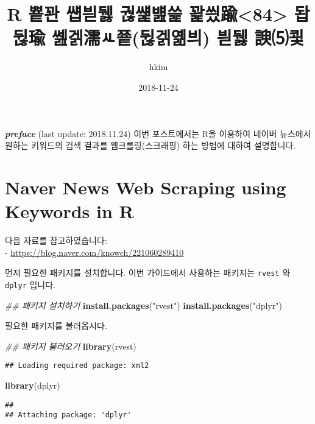 \documentclass[]{article}
\title{R 뿉꽌 썝븯뒗 궎썙뱶쓽 꽕씠踰\textless{}84\textgreater{} 돱뒪瑜
쎒겕濡ㅻ쭅(뒪겕옒븨) 븯뒗 諛⑸쾿}
\author{hkim}
\date{2018-11-24}
\newenvironment{Shaded}{\begin{snugshade}}{\end{snugshade}}
\newcommand{\CommentTok}[1]{\textcolor[rgb]{0.56,0.35,0.01}{\textit{#1}}}
\newcommand{\KeywordTok}[1]{\textcolor[rgb]{0.13,0.29,0.53}{\textbf{#1}}}
\newcommand{\NormalTok}[1]{#1}
\newcommand{\StringTok}[1]{\textcolor[rgb]{0.31,0.60,0.02}{#1}}
\begin{document}
\maketitle

\textbf{\emph{preface}} (last update: 2018.11.24) 이번 포스트에서는 R을
이용하여 네이버 뉴스에서 원하는 키워드의 검색 결과를 웹크롤링(스크래핑)
하는 방법에 대하여 설명합니다.

\hypertarget{naver-news-web-scraping-using-keywords-in-r}{%
\section{Naver News Web Scraping using Keywords in
R}\label{naver-news-web-scraping-using-keywords-in-r}}

다음 자료를 참고하였습니다:\\
- \url{https://blog.naver.com/knowch/221060289410}

먼저 필요한 패키지를 설치합니다. 이번 가이드에서 사용하는 패키지는
\texttt{rvest} 와 \texttt{dplyr} 입니다.

\begin{Shaded}
\begin{Highlighting}[]
\CommentTok{## 패키지 설치하기 }
\KeywordTok{install.packages}\NormalTok{(}\StringTok{"rvest"}\NormalTok{)}
\KeywordTok{install.packages}\NormalTok{(}\StringTok{"dplyr"}\NormalTok{)}
\end{Highlighting}
\end{Shaded}

필요한 패키지를 불러옵시다.

\begin{Shaded}
\begin{Highlighting}[]
\CommentTok{## 패키지 불러오기}
\KeywordTok{library}\NormalTok{(rvest)}
\end{Highlighting}
\end{Shaded}

\begin{verbatim}
## Loading required package: xml2
\end{verbatim}

\begin{Shaded}
\begin{Highlighting}[]
\KeywordTok{library}\NormalTok{(dplyr)}
\end{Highlighting}
\end{Shaded}

\begin{verbatim}
## 
## Attaching package: 'dplyr'
\end{verbatim}
\end{document}
